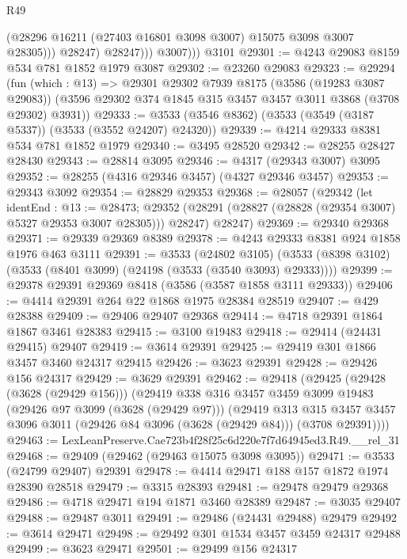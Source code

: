 \begin{lexlean}{R49}
\begin{coremodule}
                    (@28296 @16211 (@27403 @16801 @3098 @3007) @15075 @3098 @3007 @28305)))
                @28247)
              @28247)))
          @3007)))
    @3101
@29301 := @4243 @29083 @8159 @534 @781 @1852 @1979 @3087
@29302 := @23260 @29083
@29323 := @29294
    (fun (which : @13) =>
    @29301
      @29302
      @7939
      @8175
      (@3586 (@19283 @3087 @29083))
      (@3596 @29302 @374 @1845 @315 @3457 @3457 @3011 @3868 (@3708 @29302) @3931))
@29333 := @3533 (@3546 @8362) (@3533 (@3549 (@3187 @5337)) (@3533 (@3552 @24207) @24320))
@29339 := @4214 @29333 @8381 @534 @781 @1852 @1979
@29340 := @3495 @28520
@29342 := @28255 @28427 @28430
@29343 := @28814 @3095
@29346 := @4317 (@29343 @3007) @3095
@29352 := @28255 (@4316 @29346 @3457) (@4327 @29346 @3457)
@29353 := @29343 @3092
@29354 := @28829 @29353
@29368 := @28057
    (@29342
      (let identEnd : @13 := @28473;
      @29352 (@28291 (@28827 (@28828 (@29354 @3007) @5327 @29353 @3007 @28305))) @28247)
      @28247)
@29369 := @29340 @29368
@29371 := @29339 @29369 @8389
@29378 := @4243 @29333 @8381 @924 @1858 @1976 @463 @3111
@29391 := @3533
    (@24802 @3105)
    (@3533 (@8398 @3102) (@3533 (@8401 @3099) (@24198 (@3533 (@3540 @3093) @29333))))
@29399 := @29378 @29391 @29369 @8418 (@3586 (@3587 @1858 @3111 @29333))
@29406 := @4414 @29391 @264 @22 @1868 @1975 @28384 @28519
@29407 := @429 @28388
@29409 := @29406 @29407 @29368
@29414 := @4718 @29391 @1864 @1867 @3461 @28383
@29415 := @3100 @19483
@29418 := @29414 (@24431 @29415) @29407
@29419 := @3614 @29391
@29425 := @29419 @301 @1866 @3457 @3460 @24317 @29415
@29426 := @3623 @29391
@29428 := @29426 @156 @24317
@29429 := @3629 @29391
@29462 := @29418
    (@29425
      (@29428 (@3628 (@29429 @156)))
      (@29419
        @338
        @316
        @3457
        @3459
        @3099
        @19483
        (@29426 @97 @3099 (@3628 (@29429 @97)))
        (@29419
          @313
          @315
          @3457
          @3457
          @3096
          @3011
          (@29426 @84 @3096 (@3628 (@29429 @84)))
          (@3708 @29391))))
@29463 := LexLeanPreserve.Cae723b4f28f25c6d220e7f7d64945ed3.R49.__rel_31
@29468 := @29409 (@29462 (@29463 @15075 @3098 @3095))
@29471 := @3533 (@24799 @29407) @29391
@29478 := @4414 @29471 @188 @157 @1872 @1974 @28390 @28518
@29479 := @3315 @28393
@29481 := @29478 @29479 @29368
@29486 := @4718 @29471 @194 @1871 @3460 @28389
@29487 := @3035 @29407
@29488 := @29487 @3011
@29491 := @29486 (@24431 @29488) @29479
@29492 := @3614 @29471
@29498 := @29492 @301 @1534 @3457 @3459 @24317 @29488
@29499 := @3623 @29471
@29501 := @29499 @156 @24317

\end{coremodule}
\end{lexlean}
